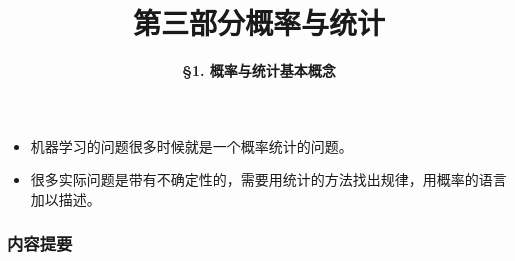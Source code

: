 



\title[Probability \& Statistics]{\LARGE \bfseries 第三部分\quad 概率与统计} %
\author[Basic Concepts] %
{\Large \bfseries \S 1. 概率与统计基本概念}
\date{}






\begin{frame}

\titlepage %

\end{frame}


\begin{frame}

\begin{itemize}
\item 机器学习的问题很多时候就是一个概率统计的问题。
\vspace{1em}
\item 很多实际问题是带有不确定性的，需要用统计的方法找出规律，用概率的语言加以描述。
\end{itemize}

\end{frame}


\begin{frame}
\frametitle{内容提要} %
\tableofcontents %
\end{frame}

